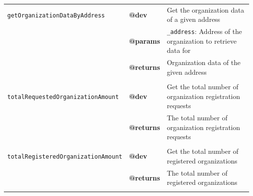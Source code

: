 \begin{table}[H]
{\begin{tabular}{lll}
                          &                   &                                                                                                                \\ \hline
\texttt{getOrganizationDataByAddress} &     \textbf{@dev}         & Get the organization data of a given address                                                                 \\
                          & \textbf{@params}           & \texttt{\_address}: Address of the organization to retrieve data for                                                           \\
                          & \textbf{@returns}           & Organization data of the given address                                                                 \\
                          &                   &                                                                                                                \\ \hline
\texttt{totalRequestedOrganizationAmount} &       \textbf{@dev}       & Get the total number of organization registration requests                                                                           \\
                          & \textbf{@returns}           & The total number of organization registration requests                                                                      \\
                          &                   &                                                                                                                \\ \hline
\texttt{totalRegisteredOrganizationAmount} &       \textbf{@dev}        & Get the total number of registered organizations                                                                 \\
                          & \textbf{@returns}           & The total number of registered organizations                                                                      \\
                          &                   &                                                                                                                \\ \hline
\end{tabular}%
}
\end{table}


% 
% 
% 
% 